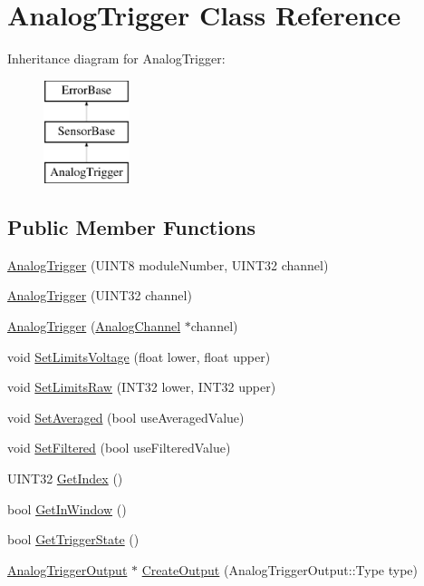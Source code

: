 \hypertarget{classAnalogTrigger}{
\section{AnalogTrigger Class Reference}
\label{classAnalogTrigger}
}
Inheritance diagram for AnalogTrigger:\begin{figure}[H]
\begin{center}
\leavevmode
\includegraphics[height=3.000000cm]{classAnalogTrigger}
\end{center}
\end{figure}
\subsection*{Public Member Functions}
\begin{DoxyCompactItemize}
\item 
\hyperlink{classAnalogTrigger_ab5a0465e88caf9d19e30b9ecdf3e0cba}{AnalogTrigger} (UINT8 moduleNumber, UINT32 channel)
\item 
\hyperlink{classAnalogTrigger_a336d4a7382c5616b1881e7c16f3e2bc0}{AnalogTrigger} (UINT32 channel)
\item 
\hyperlink{classAnalogTrigger_aee536c4e10aefc84394532d7b9b68b49}{AnalogTrigger} (\hyperlink{classAnalogChannel}{AnalogChannel} $\ast$channel)
\item 
void \hyperlink{classAnalogTrigger_a2c93aad3d8086ef2627bad4f642e538d}{SetLimitsVoltage} (float lower, float upper)
\item 
void \hyperlink{classAnalogTrigger_a495e6dbbca044e64399e28af60bf5ca1}{SetLimitsRaw} (INT32 lower, INT32 upper)
\item 
void \hyperlink{classAnalogTrigger_a450ceb7903cc3cc62beb712bdb2365b4}{SetAveraged} (bool useAveragedValue)
\item 
void \hyperlink{classAnalogTrigger_a1a362d7f7e82eed22d3d384b7a7792fa}{SetFiltered} (bool useFilteredValue)
\item 
UINT32 \hyperlink{classAnalogTrigger_a674516aebe1f7be51110658333957385}{GetIndex} ()
\item 
bool \hyperlink{classAnalogTrigger_a67f35a6ae7f5d4cde09530b9c35a471c}{GetInWindow} ()
\item 
bool \hyperlink{classAnalogTrigger_a867ff45d7b9d30ee8b9970175862a3aa}{GetTriggerState} ()
\item 
\hyperlink{classAnalogTriggerOutput}{AnalogTriggerOutput} $\ast$ \hyperlink{classAnalogTrigger_a9873edc2ccb82375c63f69b4355de52d}{CreateOutput} (AnalogTriggerOutput::Type type)
\end{DoxyCompactItemize}
